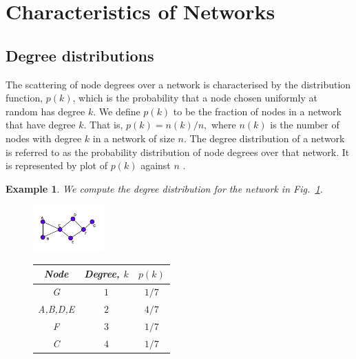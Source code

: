 \documentclass[10pt,a4paper]{article}
\newtheorem{exa}{Example}
\begin{document}
\section{Characteristics of Networks}
\subsection{Degree distributions}
The scattering of node degrees over a network is characterised by the distribution function, $p(k)$, which is the probability that a node chosen uniformly at random has degree $k$. We define $p(k)$ to be the fraction of nodes in a network that have degree $k$. That is, $p(k) = n(k)/n,$ where $n(k)$ is the number of nodes with degree $k$ in a network of size $n$. The degree distribution of a network is  referred to as the probability distribution of node degrees over that network. It is represented by plot of $p(k)$ against $n$ \citep{estrada2011structure}. 

\begin{exa} We compute the degree distribution for the network in Fig.~\ref{deg-distb}.
	
	\begin{figure}[H]
		\centering
		\begin{minipage}[t]{.30\textwidth}
			\centering
			\vspace{0pt}
			\includegraphics[width=\textwidth]{images/degree-prob.pdf}
			\label{deg-distb}
		\end{minipage}
		\hfill
		\begin{minipage}[t]{.64\textwidth}
			\centering
			\vspace{0pt}
			\setlength{\tabcolsep}{15pt}
			\renewcommand{\arraystretch}{1.2}
			\begin{tabular}{|c|c|c|}
				\hline 
				Node & Degree, $k$ & $p(k)$ \\
				\hline
				G & $1$ & $1/7$ \\
				A,B,D,E & $2$ & $4/7$ \\
				F & $3$ & $1/7$ \\
				C & $4$ & $1/7$ \\
				\hline
			\end{tabular}
		\end{minipage}
	\end{figure}
\end{exa}
\end{document}
